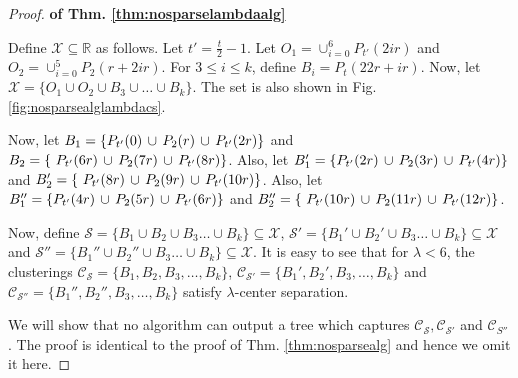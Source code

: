 \documentclass[anon,12pt]{colt2016} %
\newcommand{\mc}{\mathcal}
\begin{document}
\begin{proof}\textbf{ of Thm. \ref{thm:nosparselambdaalg}}

Define $\mc X \subseteq \mathbb{R}$ as follows. Let $t' = \frac{t}{2}-1$. Let $O_1 = \cup_{i=0}^6 P_{t'}(2ir)$ and $O_2 = \cup_{i=0}^5 P_2(r+2ir)$. For $3\le i\le k$, define $B_i = P_t(22r+ir)$. Now, let $\mc X = \{O_1 \cup O_2 \cup B_3 \cup \ldots \cup B_k\}$. The set is also shown in Fig. \ref{fig:nosparsealglambdacs}.

Now, let $B_1 = \{P_{t'}(0) \thinspace\cup\thinspace  P_{2}(r) \thinspace\cup\thinspace P_{t'}(2r) \}$ and $B_2 = \{\ P_{t'}(6r) \thinspace\cup\thinspace P_{2}(7r)\thinspace\cup\thinspace P_{t'}(8r)\}$. Also, let $B_1' = \{P_{t'}(2r) \thinspace\cup\thinspace  P_{2}(3r) \thinspace\cup\thinspace P_{t'}(4r) \}$ and $B_2' = \{\ P_{t'}(8r) \thinspace\cup\thinspace P_{2}(9r)\thinspace\cup\thinspace P_{t'}(10r)\}$. Also, let $B_1'' = \{P_{t'}(4r) \thinspace\cup\thinspace  P_{2}(5r) \thinspace\cup\thinspace P_{t'}(6r) \}$ and $B_2'' = \{\ P_{t'}(10r) \thinspace\cup\thinspace P_{2}(11r)\thinspace\cup\thinspace P_{t'}(12r)\}$. 

Now, define $\mc S = \{B_1 \cup B_2 \cup B_3\ldots \cup B_k\} \subseteq \mc X$, $\mc S' = \{B_1' \cup B_2' \cup B_3\ldots \cup B_k\} \subseteq \mc X$ and $\mc S'' = \{B_1'' \cup B_2'' \cup B_3\ldots \cup B_k\} \subseteq \mc X$. It is easy to see that for $\lambda < 6$, the clusterings $\mc C_{\mc S} = \{B_1, B_2, B_3, \ldots, B_k\}$, $\mc C_{\mc S'} = \{B_1', B_2', B_3, \ldots, B_k\}$ and $\mc C_{\mc S''} = \{B_1'', B_2'', B_3, \ldots, B_k\}$ satisfy $\lambda$-center separation.

We will show that no algorithm can output a tree which captures $\mc C_{\mc S}, \mc C_{\mc S'}$ and $\mc C_{S''}$. The proof is identical to the proof of Thm. \ref{thm:nosparsealg} and hence we omit it here.
\end{proof}
\end{document}
